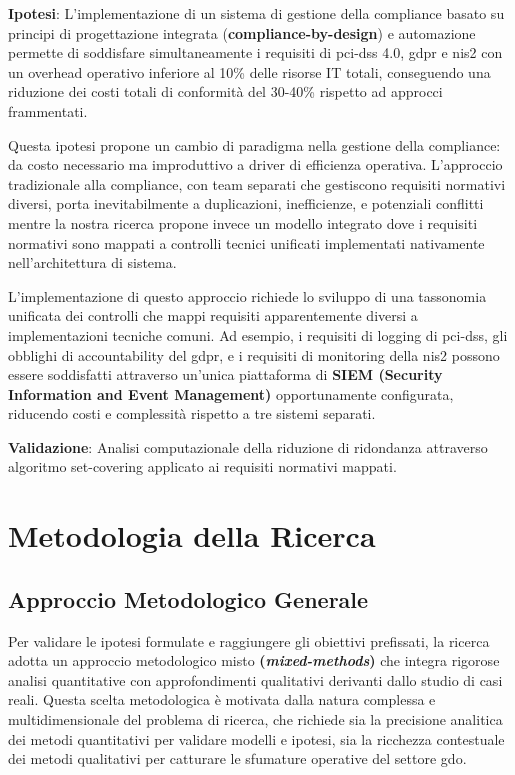 \label{ssec:h3}
\textbf{Ipotesi}: L'implementazione di un sistema di gestione della compliance basato su principi di progettazione integrata (\textbf{\gls{compliance-by-design}}) e automazione permette di soddisfare simultaneamente i requisiti di \gls{pci-dss} 4.0, \gls{gdpr} e \gls{nis2} con un overhead operativo inferiore al 10\% delle risorse IT totali, conseguendo una riduzione dei costi totali di conformità del 30-40\% rispetto ad approcci frammentati.

Questa ipotesi propone un cambio di paradigma nella gestione della compliance: da costo necessario ma improduttivo a driver di efficienza operativa. L'approccio tradizionale alla compliance, con team separati che gestiscono requisiti normativi diversi, porta inevitabilmente a duplicazioni, inefficienze, e potenziali conflitti mentre la nostra ricerca propone invece un modello integrato dove i requisiti normativi sono mappati a controlli tecnici unificati implementati nativamente nell'architettura di sistema.

L'implementazione di questo approccio richiede lo sviluppo di una tassonomia unificata dei controlli che mappi requisiti apparentemente diversi a implementazioni tecniche comuni. Ad esempio, i requisiti di logging di \gls{pci-dss}, gli obblighi di accountability del \gls{gdpr}, e i requisiti di monitoring della \gls{nis2} possono essere soddisfatti attraverso un'unica piattaforma di \textbf{SIEM (Security Information and Event Management)} opportunamente configurata, riducendo costi e complessità rispetto a tre sistemi separati.

\textbf{Validazione}: Analisi computazionale della riduzione di ridondanza attraverso algoritmo set-covering applicato ai requisiti normativi mappati.

\section{\texorpdfstring{\textbf{Metodologia della Ricerca}}{1.5 - Metodologia della Ricerca}}
\label{sec:metodologia}

\subsection{\texorpdfstring{\textbf{Approccio Metodologico Generale}}{1.5.1 - Approccio Metodologico Generale}}
\label{ssec:approccio_metodologico}

Per validare le ipotesi formulate e raggiungere gli obiettivi prefissati, la ricerca adotta un approccio metodologico misto \textbf{(\textit{mixed-methods})} che integra rigorose analisi quantitative con approfondimenti qualitativi derivanti dallo studio di casi reali. Questa scelta metodologica è motivata dalla natura complessa e multidimensionale del problema di ricerca, che richiede sia la precisione analitica dei metodi quantitativi per validare modelli e ipotesi, sia la ricchezza contestuale dei metodi qualitativi per catturare le sfumature operative del settore \gls{gdo}.

